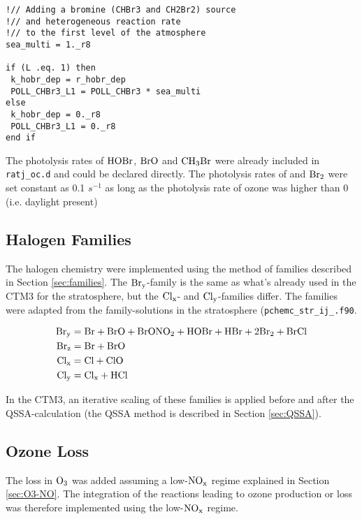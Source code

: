 \begin{lstlisting}
!// Adding a bromine (CHBr3 and CH2Br2) source 
!// and heterogeneous reaction rate 
!// to the first level of the atmosphere
sea_multi = 1._r8

if (L .eq. 1) then
 k_hobr_dep = r_hobr_dep
 POLL_CHBr3_L1 = POLL_CHBr3 * sea_multi
else
 k_hobr_dep = 0._r8
 POLL_CHBr3_L1 = 0._r8
end if
\end{lstlisting}


The photolysis rates of $\mathrm{HOBr}$, $\mathrm{BrO}$ and $\mathrm{CH_3Br}$ were already included in \texttt{ratj\_oc.d} and could be declared directly. The photolysis rates of  and $\mathrm{Br_2}$ were set constant as 0.1 $s^{-1}$ as long as the photolysis rate of ozone was higher than 0 (i.e. daylight present)


\subsection{Halogen Families}\label{sec:halogen_families_BryClxCly}

The halogen chemistry were implemented using the method of families described in Section \ref{sec:families}. The $\mathrm{Br_y}$-family is the same as what's already used in the CTM3 for the stratosphere, but the $\mathrm{Cl_x}$- and $\mathrm{Cl_y}$-families differ. The families were adapted from the family-solutions in the stratosphere (\texttt{pchemc\_str\_ij\_.f90}. 
 
\begin{align*}
    \mathrm{Br_y} &= \mathrm{Br} + \mathrm{BrO} + \mathrm{BrONO_2} + \mathrm{HOBr} + \mathrm{HBr} + 2\mathrm{Br_2} + \mathrm{BrCl} \\
    \mathrm{Br_z} & = \mathrm{Br} + \mathrm{BrO} \\
    \mathrm{Cl_x} &= \mathrm{Cl} + \mathrm{ClO} \\
    \mathrm{Cl_y} &= \mathrm{Cl_x} + \mathrm{HCl}
\end{align*}

In the CTM3, an iterative scaling of these families is applied before and after the QSSA-calculation (the QSSA method is described in Section \ref{sec:QSSA}).



\subsection{Ozone Loss}


The loss in $\mathrm{O_3}$ was added assuming a low-$\mathrm{NO_x}$ regime explained in Section \ref{sec:O3-NO}. The integration of the reactions leading to ozone production or loss was therefore implemented using the low-$\mathrm{NO_x}$ regime.

